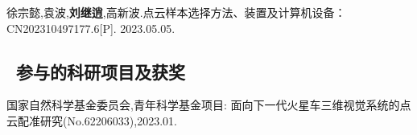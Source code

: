\noindent [3]
\begin{minipage}[t]{0.96\linewidth}
徐宗懿,袁波,\textbf{刘继逍},高新波.点云样本选择方法、装置及计算机设备：CN202310497177.6[P]. 2023.05.05.
\end{minipage}

\subsection{ \ 参与的科研项目及获奖}
\noindent [1]
\begin{minipage}[t]{0.96\linewidth}
国家自然科学基金委员会,青年科学基金项目: 面向下一代火星车三维视觉系统的点云配准研究(No.62206033),2023.01.
\end{minipage}



